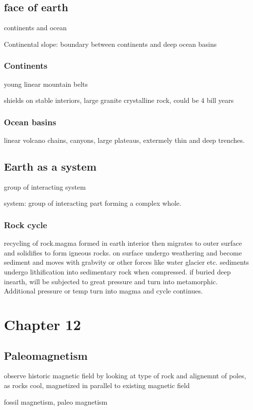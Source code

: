 \documentclass[11pt]{amsart}
\begin{document}
  \subsection{face of earth}
  \par continents and ocean
  \par Continental slope: boundary between continents and deep ocean basins
  \subsubsection{Continents}
  \par young linear mountain belts
  \par shields on stable interiors, large granite crystalline rock, could be 4
  bill years
  \subsubsection{Ocean basins}
  \par linear volcano chains, canyons, large plateaus, extermely thin and deep
  trenches.
  \subsection{Earth as a system}
  \par group of interacting system
  \par system: group of interacting part forming a complex whole.
  \subsubsection{Rock cycle}
  \par recycling of rock.magma formed in earth interior  then migrates to outer
  surface and solidifies to form igneous rocks. on surface undergo weathering
  and become sediment and moves with grabvity or other forces like water
  glacier etc. sediments undergo lithification into sedimentary rock when
  compressed. if buried deep inearth, will be subjected to great pressure and
  turn into metamorphic. Additional pressure or temp turn into magma and cycle
  continues.
  \section{Chapter 12}
  \subsection{Paleomagnetism}
  \par observe historic magnetic field by looking at type of rock and alignemnt
  of poles, as rocks cool, magnetized in parallel to existing magnetic field
  \par fossil magnetism, paleo magnetism
\end{document}

